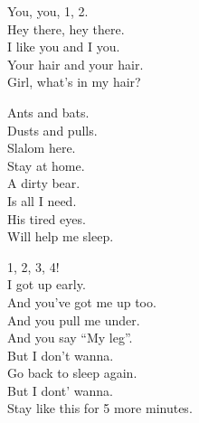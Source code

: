 
\label{ep:teenage-gizzard}




You, you, 1, 2. \\

Hey there, hey there. \\
I like you and I  you. \\
Your hair and your hair. \\

Girl, what's in my hair? \\




Ants and bats. \\
Dusts and pulls. \\
Slalom here. \\
Stay at home. \\

A dirty bear. \\
Is all I need. \\
His tired eyes. \\
Will help me sleep. \\




1, 2, 3, 4! \\

I got up early. \\
And you've got me up too. \\
And you pull me under. \\
And you say ``My leg''. \\
But I don't wanna. \\
Go back to sleep again. \\
But I dont' wanna. \\
Stay like this for 5 more minutes. \\

